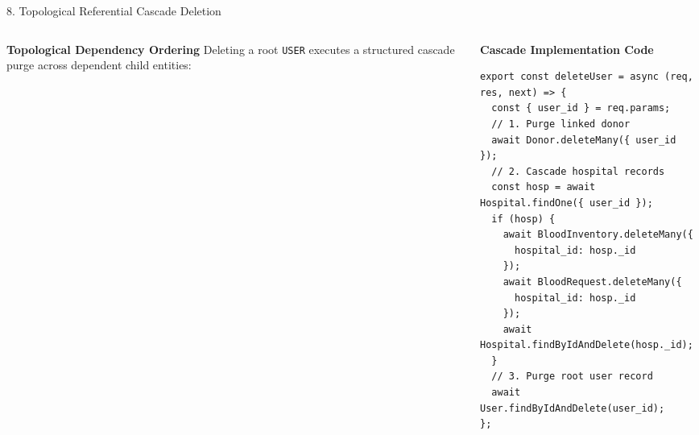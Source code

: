 \documentclass[aspectratio=169,10pt]{beamer}
\begin{document}
\begin{frame}[fragile]{8. Topological Referential Cascade Deletion}
    \begin{columns}[T]
        \begin{column}{0.48\textwidth}
            \begin{block}{\textbf{Topological Dependency Ordering}}
                \scriptsize
                Deleting a root \texttt{USER} executes a structured cascade purge across dependent child entities:
                \begin{center}
                \end{center}
            \end{block}
        \end{column}
        \begin{column}{0.52\textwidth}
            \begin{alertblock}{\textbf{Cascade Implementation Code}}
\begin{lstlisting}
export const deleteUser = async (req, res, next) => {
  const { user_id } = req.params;
  // 1. Purge linked donor
  await Donor.deleteMany({ user_id });
  // 2. Cascade hospital records
  const hosp = await Hospital.findOne({ user_id });
  if (hosp) {
    await BloodInventory.deleteMany({ 
      hospital_id: hosp._id 
    });
    await BloodRequest.deleteMany({ 
      hospital_id: hosp._id 
    });
    await Hospital.findByIdAndDelete(hosp._id);
  }
  // 3. Purge root user record
  await User.findByIdAndDelete(user_id);
};
\end{lstlisting}
            \end{alertblock}
        \end{column}
    \end{columns}
\end{frame}
\end{document}

